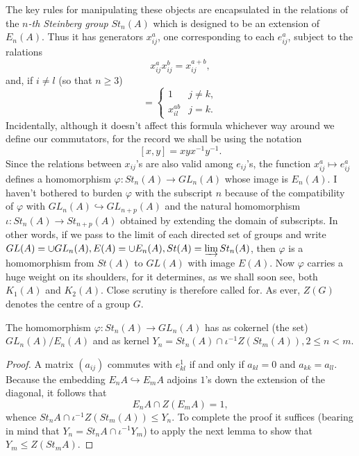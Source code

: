 The key rules for manipulating these objects are encapsulated in the relations of the {\em $n$-th Steinberg group} $St_n(A)$ which is designed to be an extension of $E_n(A)$. Thus it has generators $x_{ij}^a$, one corresponding to each $e_{ij}^a$, subject to the ralations
\[x_{ij}^a x_{ij}^b=x_{ij}^{a+b},\]
and, if $i\neq l$ (so that $n\geqslant 3$)
\begin{equation*}
	[x_{ij}^a,x_{kj}^b]=\left\{
	\begin{array}{cc}
	1 & j\neq k,\\
	x_{il}^{ab} & j=k.
	\end{array}
	\right.
\end{equation*}
Incidentally, although it doesn't affect this formula whichever way around we define our commutators, for the record we shall be using the notation
\[[x,y]=xyx^{-1}y^{-1}.\]
Since the relations between $x_{ij}$'s are also valid among $e_{ij}$'s, the function $x_{ij}^a \mapsto e_{ij}^a$ defines a homomorphism $\varphi\colon  St_n(A)\rightarrow GL_n(A)$ whose image is $E_n(A)$. I haven't bothered to burden $\varphi$ with the subscript $n$ because of the compatibility of $\varphi$ with $GL_n(A)\hookrightarrow GL_{n+p}(A)$ and the natural homomorphism $\iota\colon St_n(A)\rightarrow St_{n+p}(A)$ obtained by extending the domain of subscripts. In other words, if we pass to the limit of each directed set of groups and write $GL(A)=\cup GL_n(A), E(A)=\cup E_n(A), St(A)=\varinjlim St_n(A)$, then $\varphi$ is a homomorphism from $St(A)$ to $GL(A)$ with image $E(A)$. Now $\varphi$ carries a huge weight on its shoulders, for it determines, as we shall soon see, both $K_1(A)$ and $K_2(A)$. Close scrutiny is therefore called for. As ever, $Z(G)$ denotes the centre of a group $G$.
\begin{lemma}\label{1.1}
The homomorphism $\varphi\colon  St_n(A)\rightarrow GL_n(A)$ has as cokernel (the set) $GL_n(A)/E_n(A)$ and as kernel $Y_n=St_n(A)\cap \iota^{-1}Z(St_m(A)), 2\leqslant n < m.$
\end{lemma}
\begin{proof}
A matrix $(a_{ij})$ commutes with $e_{kl}^1$ if and only if $a_{kl}=0$ and $a_{kk}=a_{ll}$. Because the embedding $E_nA\hookrightarrow E_mA$ adjoins $1$'s down the extension of the diagonal, it follows that
\[E_nA\cap Z(E_mA)=1,\]
whence
$St_nA\cap \iota^{-1}Z(St_m(A))\leqslant Y_n.$
To complete the proof it suffices (bearing in mind that $Y_n=St_nA\cap \iota^{-1}Y_m$) to apply the next lemma to show that $Y_m\leqslant Z(St_mA)$.
\end{proof}
